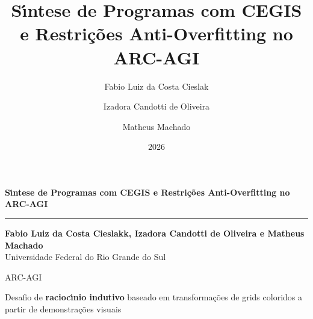 \documentclass[aspectratio=169, 10pt]{beamer}
\title[ARC-AGI: CEGIS e Anti-Overfitting]{S\'{\i}ntese de Programas com CEGIS e Restri\c{c}\~{o}es Anti-Overfitting no ARC-AGI}
\author{Fabio Luiz da Costa Cieslak \and Izadora Candotti de Oliveira \and Matheus Machado}
\institute{Universidade Federal do Rio Grande do Sul (UFRGS)}
\date{2026}
\begin{document}
\begin{frame}[plain]
  \centering
  \color{mainblue}
  
  {\huge \bfseries S\'{\i}ntese de Programas com CEGIS e Restri\c{c}\~{o}es Anti-Overfitting no ARC-AGI}\\[0.5em]

  \smallskip
  \noindent\rule{\textwidth}{1.5pt}
  \medskip

  \textbf{Fabio Luiz da Costa Cieslakk, Izadora Candotti de Oliveira e Matheus Machado}\\[0.3em]
  {\small Universidade Federal do Rio Grande do Sul}\\[1cm]
\end{frame}

\begin{frame}[fragile]{ARC-AGI}
    \vspace{1.0em}
    
    \begin{center}
        \Large Desafio de \textbf{racioc\'{\i}nio indutivo} baseado em transformações de grids coloridos a partir de demonstra\c{c}\~{o}es visuais
    \end{center}

    
\end{frame}
\end{document}
